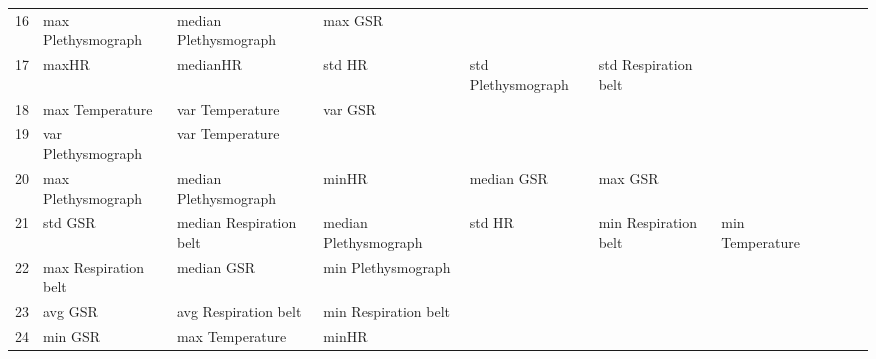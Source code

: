 \begin{landscape}
\begin{table}[]
\begin{tabular}{l|llllllll}
16       & max Plethysmograph      & median Plethysmograph   & max GSR                 &                         &                         &                       &                         &                         &                         &         \\
17       & maxHR                   & medianHR                & std HR                  & std Plethysmograph      & std Respiration belt    &                       &                         &                         &                         &         \\
18       & max Temperature         & var Temperature         & var GSR                 &                         &                         &                       &                         &                         &                         &         \\
19       & var Plethysmograph      & var Temperature         &                         &                         &                         &                       &                         &                         &                         &         \\
20       & max Plethysmograph      & median Plethysmograph   & minHR                   & median GSR              & max GSR                 &                       &                         &                         &                         &         \\
21       & std GSR                 & median Respiration belt & median Plethysmograph   & std HR                  & min Respiration belt    & min Temperature       &                         &                         &                         &         \\
22       & max Respiration belt    & median GSR              & min Plethysmograph      &                         &                         &                       &                         &                         &                         &         \\
23       & avg GSR                 & avg Respiration belt    & min Respiration belt    &                         &                         &                       &                         &                         &                         &         \\
24       & min GSR                 & max Temperature         & minHR                   &                         &                         &                       &                         &                         &                         &         \\

\end{tabular}
\end{table}
\end{landscape}
